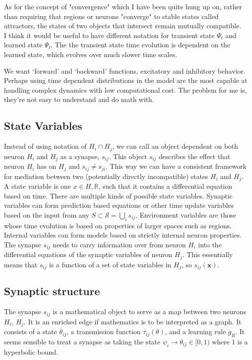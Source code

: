 \documentclass{article}
\begin{document}
As for the concept of "convergence" which I have been quite hung up on, rather than requiring that regions or neurons "converge" to stable states called attractors, the states of two objects that intersect remain mutually compatible. \\

I think it would be useful to have different notation for transient state $\Psi_t$ and learned state $\Psi_l$. The the transient state time evolution is dependent on the learned state, which evolves over much slower time scales.

We want `forward' and `backward' functions, excitatory and inhibitory behavior. Perhaps using time dependent distributions in the model are the most capable at handling complex dynamics with low computational cost. The problem for me is, they're not easy to understand and do math with.

\subsection{State Variables}
Instead of using notation of $H_i \cap H_j$, we can call an object dependent on both neuron $H_i$ and $H_j$ as a synapse, $s_{ij}$. This object $s_{ij}$ describes the effect that neuron $H_i$ has on $H_j$ and $s_{ij} \ne s_{ji}$. This way we can have a consistent framework for mediation between two (potentially directly incompatible) states $H_i$ and $H_j$. \\

A state variable is one $x \in H, \mathbb{R}$, such that it contains a differential equation based on time. There are multiple kinds of possible state variables. Synaptic variables can form prediction based equations or other time update variables based on the input from any $S \subset \mathcal{S} = \bigcup_i s_{ij}$. Environment variables are those whose time evolution is based on properties of larger spaces such as regions. Internal variables can form models based on strictly internal neuron properties. \\

The synapse $s_{ij}$ needs to carry information over from neuron $H_i$ into the differential equations of the synaptic variables of neuron $H_j$. This essentially means that $s_{ij}$ is a function of a set of state variables in $H_j$, so $s_{ij}(\mathbf{x})$. 

\subsection{Synaptic structure}
The synapse $s_{ij}$ is a mathematical object to serve as a map between two neurons $H_i$, $H_j$. It is an enriched edge if mathematics is to be interpreted as a graph. It consists of a state $\theta_{ij}$, a transmission function $\tau_{ij}(\theta)$, and a learning rule $g_R$. It seems sensible to treat a synapse as taking the state $\psi_i \to \theta_{ij} \in [0,1)$ where 1 is a hyperbolic bound. \\
\end{document}
